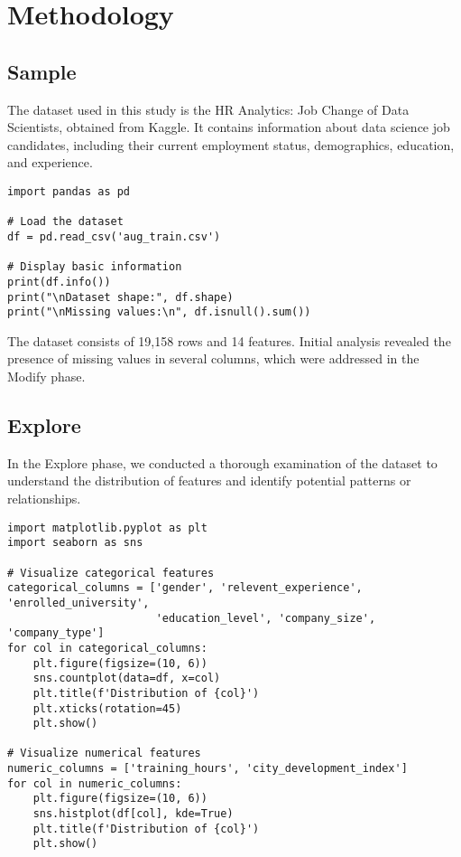 \documentclass[12pt]{article}
\begin{document}
\section{Methodology}

\subsection{Sample}
The dataset used in this study is the HR Analytics: Job Change of Data Scientists, obtained from Kaggle. It contains information about data science job candidates, including their current employment status, demographics, education, and experience.

\begin{verbatim}
import pandas as pd

# Load the dataset
df = pd.read_csv('aug_train.csv')

# Display basic information
print(df.info())
print("\nDataset shape:", df.shape)
print("\nMissing values:\n", df.isnull().sum())
\end{verbatim}

The dataset consists of 19,158 rows and 14 features. Initial analysis revealed the presence of missing values in several columns, which were addressed in the Modify phase.

\subsection{Explore}
In the Explore phase, we conducted a thorough examination of the dataset to understand the distribution of features and identify potential patterns or relationships.

\begin{verbatim}
import matplotlib.pyplot as plt
import seaborn as sns

# Visualize categorical features
categorical_columns = ['gender', 'relevent_experience', 'enrolled_university',
                       'education_level', 'company_size', 'company_type']
for col in categorical_columns:
    plt.figure(figsize=(10, 6))
    sns.countplot(data=df, x=col)
    plt.title(f'Distribution of {col}')
    plt.xticks(rotation=45)
    plt.show()

# Visualize numerical features
numeric_columns = ['training_hours', 'city_development_index']
for col in numeric_columns:
    plt.figure(figsize=(10, 6))
    sns.histplot(df[col], kde=True)
    plt.title(f'Distribution of {col}')
    plt.show()
\end{verbatim}
\end{document}
